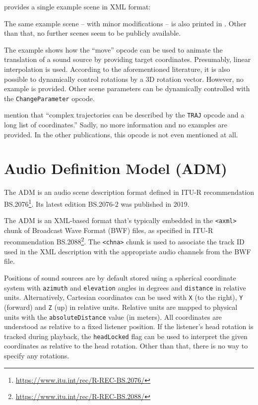\textcite[p.\,127]{potard2006object}
provides a single example scene in XML format:


\noindent
The same example scene -- with minor modifications --
is also printed in \parencite[fig.\,5, p.\,4]{potard2004xml}.
Other than that, no further scenes seem to be publicly available.

The example shows how the ``move'' opcode can be used
to animate the translation of a sound source by providing target coordinates.
Presumably, linear interpolation is used.
According to the aforementioned literature,
it is also possible to dynamically control rotations
by a 3D rotation vector.
However, no example is provided.
Other scene parameters can be dynamically controlled with the
\texttt{ChangeParameter} opcode.

\textcite{potard2003encoding} mention that
``complex trajectories can be described by
the \texttt{TRAJ} opcode and a long list of coordinates.''
Sadly, no more information and no examples are provided.
In the other publications, this opcode is not even mentioned at all.


\section{Audio Definition Model (ADM)}
\label{sec:adm}

The ADM is an audio scene description format
defined in ITU-R recommendation
BS.2076\footnote{\url{https://www.itu.int/rec/R-REC-BS.2076/}}.
Its latest edition BS.2076-2 was published in 2019.

The ADM is an XML-based format
that's typically embedded
in the \texttt{<axml>} chunk of Broadcast Wave Format (BWF)
files, as specified in ITU-R recommendation
BS.2088\footnote{\url{https://www.itu.int/rec/R-REC-BS.2088/}}.
The \texttt{<chna>} chunk is used
to associate the track ID used in the XML description
with the appropriate audio channels from the BWF file.

Positions of sound sources are by default stored
using a spherical coordinate system with
\texttt{azimuth}
and
\texttt{elevation}
angles in degrees and
\texttt{distance}
in relative units.
Alternatively, Cartesian coordinates can be used with
\texttt{X} (to the right),
\texttt{Y} (forward) and
\texttt{Z} (up) in relative units.
Relative units are mapped to physical units with the
\texttt{absoluteDistance} value (in meters).
All coordinates are understood as relative to a fixed listener position.
If the listener's head rotation is tracked during playback,
the \texttt{headLocked} flag can be used to interpret the given
coordinates as relative to the head rotation.
Other than that, there is no way to specify any rotations.

